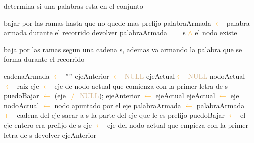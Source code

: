 \begin{algorithm}
\caption{determina si una palabras esta en el conjunto}
\begin{algorithmic}[1]
			\STATE bajar por las ramas hasta que no quede mas prefijo
			\STATE palabraArmada \textcolor{orange}{$\leftarrow$} palabra armada durante el recorrido
			\STATE devolver palabraArmada \textcolor{orange}{==} s \textcolor{orange}{$\wedge$} el nodo existe
\end{algorithmic}
\end{algorithm}		

\begin{algorithm}
\caption{baja por las ramas segun una cadena s, ademas va armando la palabra que se forma durante el recorrido }
\begin{algorithmic}[1]
\STATE cadenaArmada \textcolor{orange}{$\leftarrow$}  $""$
\STATE ejeAnterior \textcolor{orange}{$\leftarrow$}  \textcolor{Tan}{NULL}
\STATE ejeActual\textcolor{orange}{$\leftarrow$}  \textcolor{Tan}{NULL}
\STATE nodoActual \textcolor{orange}{$\leftarrow$} raiz
\STATE eje \textcolor{orange}{$\leftarrow$} eje de nodo actual que comienza con la primer letra de s
\STATE puedoBajar \textcolor{orange}{$\leftarrow$} (eje \textcolor{orange}{$\neq$} \textcolor{Tan}{NULL});
	\STATE ejeAnterior \textcolor{orange}{$\leftarrow$} ejeActual
	\STATE ejeActual \textcolor{orange}{$\leftarrow$} eje
	\STATE nodoActual \textcolor{orange}{$\leftarrow$} nodo apuntado por el eje
	\STATE palabraArmada \textcolor{orange}{$\leftarrow$} palabraArmada \textcolor{orange}{++} cadena del eje
	\STATE sacar a s la parte del eje que le es prefijo
	\STATE puedoBajar \textcolor{orange}{$\leftarrow$} el eje entero era prefijo de s
	\STATE eje \textcolor{orange}{$\leftarrow$} eje del nodo actual que empieza con la primer letra de s
\ENDWHILE
\STATE devolver ejeAnterior
\end{algorithmic}
\end{algorithm}	